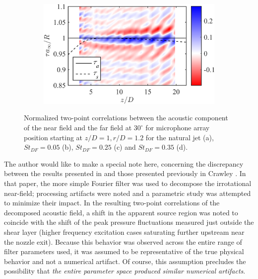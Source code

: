 \begin{figure}
\begin{subfigure}{.5\textwidth}
		\caption{}
		\label{fig:ch3_xcorrOA_St025}
	\end{subfigure}%
	\begin{subfigure}{.5\textwidth}
		\centering
		\includegraphics[width=0.95\linewidth]{Figures/ch3_St035_r120_ff30xcor_oa.png}
		\caption{}
		\label{fig:ch3_xcorrOA_St035}
	\end{subfigure}
	\caption{Normalized two-point correlations between the acoustic component of the near field and the far field at $30^\circ$ for microphone array position starting at $z/D = 1, r/D = 1.2$ for the natural jet (a), $St_{DF} = 0.05$ (b), $St_{DF} = 0.25$ (c) and $St_{DF} = 0.35$ (d).}
	\label{fig:ch3_xcorrOA}
\end{figure}

The author would like to make a special note here, concerning the discrepancy between the results presented in  and those presented previously in Crawley \etal [cite].
In that paper, the more simple Fourier filter was used to decompose the irrotational near-field; processing artifacts were noted and a parametric study was attempted to minimize their impact.
In the resulting two-point correlations of the decomposed acoustic field, a shift in the apparent source region was noted to coincide with the shift of the peak pressure fluctuations measured just outside the shear layer (higher frequency excitation cases saturating further upstream near the nozzle exit).
Because this behavior was observed across the entire range of filter parameters used, it was assumed to be representative of the true physical behavior and not a numerical artifact.
Of course, this assumption precludes the possibility that \textit{the entire parameter space produced similar numerical artifacts}. 

